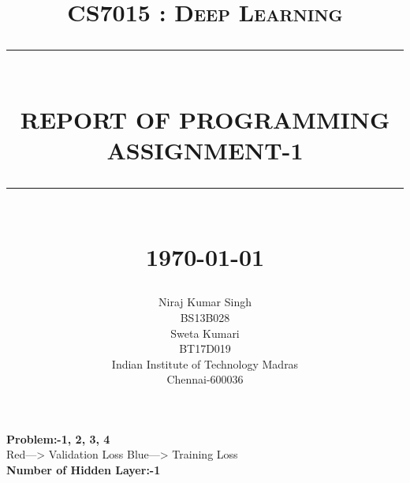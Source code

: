 \documentclass[20pt]{report}
\newcommand{\HRule}[1]{\rule{\linewidth}{#1}}
\begin{document}
\title{ \normalsize \textsc{CS7015 : Deep Learning}
		\\ [2.0cm]\HRule{0.5pt} \\
        \LARGE \textbf{\uppercase{Report of Programming Assignment-1}}
		\HRule{2pt} \\ [0.5cm]
		\normalsize \today \vspace*{5\baselineskip}}
\date{}
\author{Niraj Kumar Singh\\BS13B028\\Sweta Kumari\\BT17D019\\Indian Institute of Technology Madras\\Chennai-600036 }
\maketitle
\newpage
\sectionfont{\scshape}
\textbf{Problem:-1, 2, 3, 4}\\
Red---> Validation Loss
Blue---> Training Loss
\\
\textbf{Number of Hidden Layer:-1}\\
\end{document}
